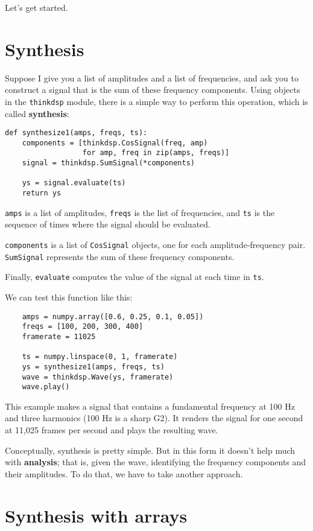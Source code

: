 \documentclass[12pt]{book}
\begin{document}
Let's get started.


\section{Synthesis}

Suppose I give you a list of amplitudes and a list of frequencies,
and ask you to construct a signal that is the sum of these frequency
components.  Using objects in the {\tt thinkdsp} module, there is
a simple way to perform this operation, which is called {\bf synthesis}:

\begin{verbatim}
def synthesize1(amps, freqs, ts):
    components = [thinkdsp.CosSignal(freq, amp)
                  for amp, freq in zip(amps, freqs)]
    signal = thinkdsp.SumSignal(*components)

    ys = signal.evaluate(ts)
    return ys
\end{verbatim}

{\tt amps} is a list of amplitudes, {\tt freqs} is the list
of frequencies, and {\tt ts} is the sequence
of times where the signal should be evaluated.

{\tt components} is a list of {\tt CosSignal} objects, one for
each amplitude-frequency pair.  {\tt SumSignal} represents the
sum of these frequency components.

Finally, {\tt evaluate} computes the value of the signal at each
time in {\tt ts}.

We can test this function like this:

\begin{verbatim}
    amps = numpy.array([0.6, 0.25, 0.1, 0.05])
    freqs = [100, 200, 300, 400]
    framerate = 11025

    ts = numpy.linspace(0, 1, framerate)
    ys = synthesize1(amps, freqs, ts)
    wave = thinkdsp.Wave(ys, framerate)
    wave.play()
\end{verbatim}

This example makes a signal that contains a fundamental frequency at
100 Hz and three harmonics (100 Hz is a sharp G2).  It renders the
signal for one second at 11,025 frames per second and plays the
resulting wave.

Conceptually, synthesis is pretty simple.  But in this form it doesn't
help much with {\bf analysis}; that is, given the wave, identifying
the frequency components and their amplitudes.  To do that, we have
to take another approach.


\section{Synthesis with arrays}
\end{document}
